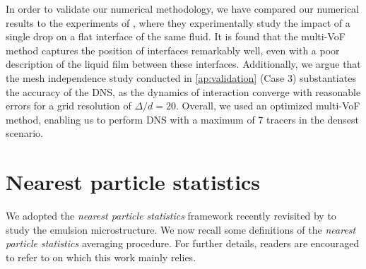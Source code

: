 \documentclass[11pt]{My_preprint}
\providecommand{\DIFadd}[1]{{\protect\color{blue}\uwave{#1}}} %
\providecommand{\DIFdel}[1]{{\protect\color{red}\sout{#1}}}                      %
\providecommand{\DIFaddbegin}{} %
\providecommand{\DIFaddend}{} %
\providecommand{\DIFdelbegin}{} %
\providecommand{\DIFdelend}{} %
\begin{document}
In order to validate our numerical methodology, we have compared our numerical results to the experiments of \citet{mohamed2003drop}, where they experimentally study the impact of a single drop on a flat interface of the same fluid. It is found that the multi-VoF method captures the position of interfaces remarkably well, even with a poor description of the liquid film between these interfaces.
Additionally, we argue that the mesh independence study conducted in \ref{ap:validation} (Case 3) substantiates the accuracy of the DNS, as the dynamics of interaction converge with reasonable errors for a grid resolution of \DIFdelbegin \DIFdel{$\Delta/d = 20$}\DIFdelend \DIFaddbegin \DIFadd{$d/\Delta = 20$}\DIFaddend . 
Overall, we used an optimized multi-VoF method, enabling us to perform DNS with a maximum of 7 tracers in the densest scenario. 





 
\section{Nearest particle statistics}
\label{sec:nearest}

We adopted the \textit{nearest particle statistics} framework recently revisited by \citet{zhang2021ensemble} to study the emulsion microstructure.
We now recall some definitions of the \textit{nearest particle statistics} averaging procedure. 
For further details, readers are encouraged to refer to \citet{zhang2021ensemble,zhang2023evolution} on which this work mainly relies.
\end{document}
